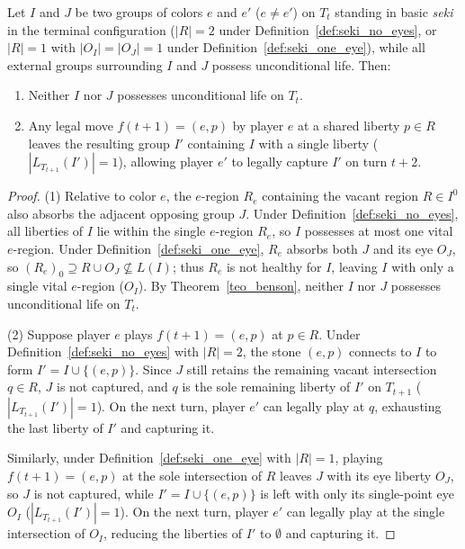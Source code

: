 \begin{lemma}\label{lem:seki_deterrence}
	Let $I$ and $J$ be two groups of colors $e$ and $e'$ ($e \neq e'$) on $T_t$ standing in basic \emph{seki} in the terminal configuration ($|R| = 2$ under Definition~\ref{def:seki_no_eyes}, or $|R| = 1$ with $|O_I| = |O_J| = 1$ under Definition~\ref{def:seki_one_eye}), while all external groups surrounding $I$ and $J$ possess unconditional life. Then:
	\begin{enumerate}
		\item Neither $I$ nor $J$ possesses unconditional life on $T_t$.
		\item Any legal move $f(t+1) = (e, p)$ by player $e$ at a shared liberty $p \in R$ leaves the resulting group $I'$ containing $I$ with a single liberty ($|L_{T_{t+1}}(I')| = 1$), allowing player $e'$ to legally capture $I'$ on turn $t+2$.
	\end{enumerate}
\end{lemma}

\begin{proof}
	(1) Relative to color $e$, the $e$-region $R_e$ containing the vacant region $R \in I^0$ also absorbs the adjacent opposing group $J$. Under Definition~\ref{def:seki_no_eyes}, all liberties of $I$ lie within the single $e$-region $R_e$, so $I$ possesses at most one vital $e$-region. Under Definition~\ref{def:seki_one_eye}, $R_e$ absorbs both $J$ and its eye $O_J$, so $(R_e)_0 \supseteq R \cup O_J \not\subseteq L(I)$; thus $R_e$ is not healthy for $I$, leaving $I$ with only a single vital $e$-region ($O_I$). By Theorem~\ref{teo_benson}, neither $I$ nor $J$ possesses unconditional life on $T_t$.
	
	(2) Suppose player $e$ plays $f(t+1) = (e, p)$ at $p \in R$. 
	Under Definition~\ref{def:seki_no_eyes} with $|R| = 2$, the stone $(e, p)$ connects to $I$ to form $I' = I \cup \{(e, p)\}$. Since $J$ still retains the remaining vacant intersection $q \in R$, $J$ is not captured, and $q$ is the sole remaining liberty of $I'$ on $T_{t+1}$ ($|L_{T_{t+1}}(I')| = 1$). On the next turn, player $e'$ can legally play at $q$, exhausting the last liberty of $I'$ and capturing it.
	
	Similarly, under Definition~\ref{def:seki_one_eye} with $|R| = 1$, playing $f(t+1) = (e, p)$ at the sole intersection of $R$ leaves $J$ with its eye liberty $O_J$, so $J$ is not captured, while $I' = I \cup \{(e, p)\}$ is left with only its single-point eye $O_I$ ($|L_{T_{t+1}}(I')| = 1$). On the next turn, player $e'$ can legally play at the single intersection of $O_I$, reducing the liberties of $I'$ to $\emptyset$ and capturing it.
\end{proof}

